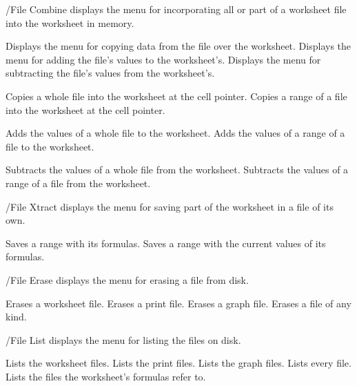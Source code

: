 /File Combine displays the menu for incorporating all or part of a
worksheet file into the worksheet in memory.
\begin{Options}
 Displays the menu for copying data from the file over the
  worksheet.
 Displays the menu for adding the file's values to the
  worksheet's.
 Displays the menu for subtracting the file's values from
  the worksheet's.
\end{Options}
\begin{Options}
 Copies a whole file into the
  worksheet at the cell pointer.
 Copies a range of a
  file into the worksheet at the cell pointer.
\end{Options}
\begin{Options}
 Adds the values of a whole file
  to the worksheet.
 Adds the values of a
  range of a file to the worksheet.
\end{Options}
\begin{Options}
 Subtracts the values of a whole
  file from the worksheet.
 Subtracts the values
  of a range of a file from the worksheet.
\end{Options}

/File Xtract displays the menu for saving part of the worksheet in a file of
its own.
\begin{Options}
 Saves a range with its formulas.
 Saves a range with the current values
  of its formulas.
\end{Options}

/File Erase displays the menu for erasing a file from disk.
\begin{Options}
 Erases a worksheet file.
 Erases a print file.
 Erases a graph file.
 Erases a file of any kind.
\end{Options}

/File List displays the menu for listing the files on disk.
\begin{Options}
 Lists the worksheet files.
 Lists the print files.
 Lists the graph files.
 Lists every file.
 Lists the files the worksheet's
  formulas refer to.
\end{Options}

